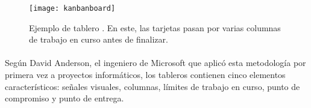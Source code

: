 \documentclass{subfiles}
\begin{document}
        \begin{figure}
        \centering
        \texttt{[image: kanbanboard]}
        \caption{Ejemplo de tablero \Kanban. En este, las tarjetas pasan por varias columnas de trabajo en curso antes de finalizar.}
        \label{fig:kanbanboard}
        \end{figure}

        \paragraph{}
        {Según David Anderson, el ingeniero de Microsoft que aplicó esta metodología por primera vez a proyectos informáticos, los tableros \Kanban contienen cinco elementos característicos: señales visuales, columnas, límites de trabajo en curso, punto de compromiso y punto de entrega.}
\end{document}
